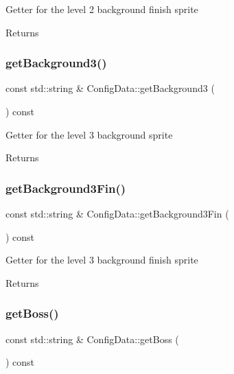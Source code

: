 Getter for the level 2 background finish sprite \begin{DoxyReturn}{Returns}

\end{DoxyReturn}
\mbox{\label{classConfigData_a374fdf7f1d3275a86b08880133fa0e16}} 
\subsubsection{\texorpdfstring{get\+Background3()}{getBackground3()}}
{\footnotesize\ttfamily const std\+::string \& Config\+Data\+::get\+Background3 (\begin{DoxyParamCaption}{ }\end{DoxyParamCaption}) const}

Getter for the level 3 background sprite \begin{DoxyReturn}{Returns}

\end{DoxyReturn}
\mbox{\label{classConfigData_aedb142fd1f37b67f0c6136ce0d7f2399}} 
\subsubsection{\texorpdfstring{get\+Background3\+Fin()}{getBackground3Fin()}}
{\footnotesize\ttfamily const std\+::string \& Config\+Data\+::get\+Background3\+Fin (\begin{DoxyParamCaption}{ }\end{DoxyParamCaption}) const}

Getter for the level 3 background finish sprite \begin{DoxyReturn}{Returns}

\end{DoxyReturn}
\mbox{\label{classConfigData_a241de31080d870efdde3046d7d9a96b8}} 
\subsubsection{\texorpdfstring{get\+Boss()}{getBoss()}}
{\footnotesize\ttfamily const std\+::string \& Config\+Data\+::get\+Boss (\begin{DoxyParamCaption}{ }\end{DoxyParamCaption}) const}

